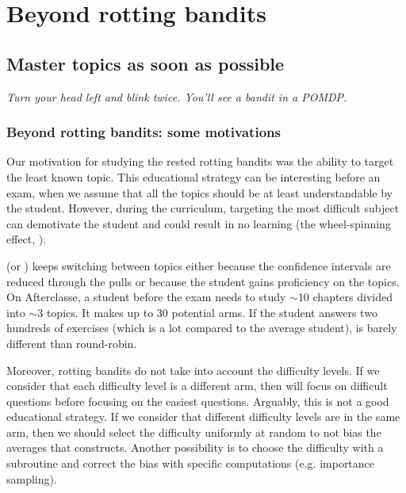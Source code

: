 \part{Beyond rotting bandits}
\chapter{Master topics as soon as possible}
\label{ch:pomdp}
\vspace{-3cm}
\begin{flushright}
\emph{Turn your head left and blink twice. You'll see a bandit in a POMDP.}
\end{flushright}
\vspace{0.85cm}
\section{Beyond rotting bandits: some motivations}
\label{sec:beyond}
Our motivation for studying the rested rotting bandits was the ability to target the least known topic. This educational strategy can be interesting before an exam, when we assume that all the topics should be at least understandable by the student. However, during the curriculum, targeting the most difficult subject can demotivate the student and could result in no learning (the wheel-spinning effect, \cite{beck2013wheel}).

\RAWUCB (or \FEWA)  keeps switching between topics either because the confidence intervals are reduced through the pulls or because the student gains proficiency on the topics. On Afterclasse, a student before the exam needs to study $\sim10$ chapters divided into $\sim3$ topics. It makes up to 30 potential arms. If the student answers two hundreds of exercises (which is a lot compared to the average student), \RAWUCB is barely different than round-robin. 

Moreover, rotting bandits do not take into account the difficulty levels. If we consider that each difficulty level is a different arm, then \RAWUCB will focus on difficult questions before focusing on the easiest questions. Arguably, this is not a good educational strategy. If we consider that different difficulty levels are in the same arm, then we should select the difficulty uniformly at random to not bias the averages that \RAWUCB constructs. Another possibility is to choose the difficulty with a subroutine and correct the bias with specific computations (e.g. importance sampling). 

